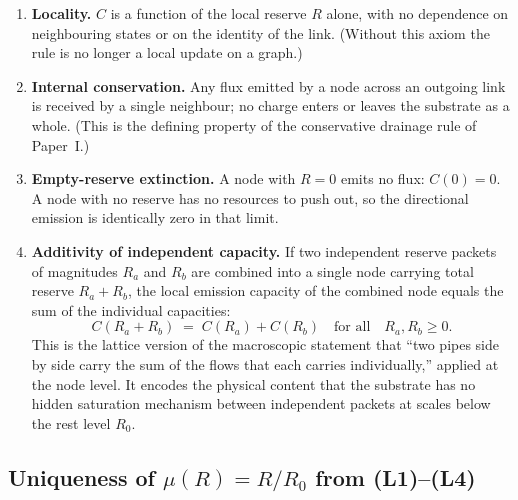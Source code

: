\documentclass[11pt,a4paper]{article}
\begin{document}
\begin{enumerate}[label=(L\arabic*)]
\item \textbf{Locality.} $C$ is a function of the local reserve
$R$ alone, with no dependence on neighbouring states or on the
identity of the link. (Without this axiom the rule is no longer
a local update on a graph.)

\item \textbf{Internal conservation.} Any flux emitted by a node
across an outgoing link is received by a single neighbour; no
charge enters or leaves the substrate as a whole. (This is the
defining property of the conservative drainage rule of Paper~I.)

\item \textbf{Empty-reserve extinction.} A node with $R = 0$
emits no flux: $C(0) = 0$. A node with no reserve has no
resources to push out, so the directional emission is identically
zero in that limit.

\item \textbf{Additivity of independent capacity.} If two
independent reserve packets of magnitudes $R_a$ and $R_b$ are
combined into a single node carrying total reserve
$R_a + R_b$, the local emission capacity of the combined node
equals the sum of the individual capacities:
\begin{equation}
C(R_a + R_b) \;=\; C(R_a) + C(R_b)
\quad\text{for all}\quad R_a, R_b \geq 0.
\label{eq:cauchy-axiom}
\end{equation}
This is the lattice version of the macroscopic statement that
``two pipes side by side carry the sum of the flows that each
carries individually,'' applied at the node level. It encodes
the physical content that the substrate has no hidden saturation
mechanism between independent packets at scales below the rest
level $R_0$.
\end{enumerate}

\subsection{Uniqueness of $\mu(R) = R/R_0$ from (L1)--(L4)}
\end{document}
